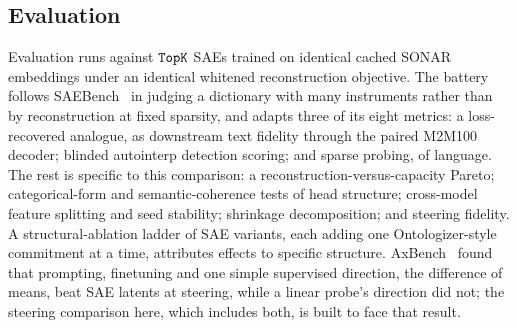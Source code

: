 \subsection{Evaluation}
Evaluation runs against $\mathop{\mathtt{TopK}}\limits$ SAEs trained on identical cached SONAR
embeddings under an identical whitened reconstruction objective. The
battery follows SAEBench~\cite{karvonen2025} in judging a dictionary
with many instruments rather than by reconstruction at fixed sparsity,
and adapts three of its eight metrics: a loss-recovered analogue, as
downstream text fidelity through the paired M2M100 decoder; blinded
autointerp detection scoring; and sparse probing, of language. The rest
is specific to this comparison: a reconstruction-versus-capacity Pareto;
categorical-form and semantic-coherence tests of head structure;
cross-model feature splitting and seed stability; shrinkage
decomposition; and steering fidelity. A
structural-ablation ladder of SAE variants, each adding one
Ontologizer-style commitment at a time, attributes effects to specific
structure. AxBench~\cite{wu2025axbenchsteeringllmssimple} found that
prompting, finetuning and one simple supervised direction, the
difference of means, beat SAE latents at steering, while a linear
probe's direction did not; the steering comparison here, which includes
both, is built to face that result.


